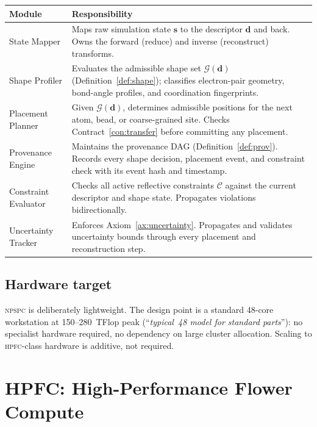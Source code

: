 \documentclass[11pt,a4paper]{article}
\theoremstyle{definition}
\theoremstyle{plain}
\newcommand{\NPSPC}{\textsc{npspc}}
\newcommand{\HPFC}{\textsc{hpfc}}
\newcommand{\desc}{\boldsymbol{d}}
\newcommand{\state}{\boldsymbol{s}}
\newcommand{\constraint}{\mathcal{C}}
\begin{document}
\begin{center}
\begin{tabular}{@{}lp{8.5cm}@{}}
\toprule
\textbf{Module} & \textbf{Responsibility} \\
\midrule
State Mapper &
  Maps raw simulation state $\state$ to the descriptor $\desc$ and back.
  Owns the forward (reduce) and inverse (reconstruct) transforms. \\[4pt]

Shape Profiler &
  Evaluates the admissible shape set $\mathcal{G}(\desc)$
  (Definition~\ref{def:shape}); classifies electron-pair geometry,
  bond-angle profiles, and coordination fingerprints. \\[4pt]

Placement Planner &
  Given $\mathcal{G}(\desc)$, determines admissible positions for
  the next atom, bead, or coarse-grained site.  Checks
  Contract~\ref{con:transfer} before committing any placement. \\[4pt]

Provenance Engine &
  Maintains the provenance DAG (Definition~\ref{def:prov}).
  Records every shape decision, placement event, and constraint
  check with its event hash and timestamp. \\[4pt]

Constraint Evaluator &
  Checks all active reflective constraints $\constraint$ against
  the current descriptor and shape state.  Propagates violations
  bidirectionally. \\[4pt]

Uncertainty Tracker &
  Enforces Axiom~\ref{ax:uncertainty}.  Propagates and validates
  uncertainty bounds through every placement and reconstruction
  step. \\
\bottomrule
\end{tabular}
\end{center}

\subsection{Hardware target}

\NPSPC{} is deliberately lightweight.  The design point is a
standard 48-core workstation at 150--280~TFlop peak
(``\emph{typical~48 model for standard parts}''): no specialist
hardware required, no dependency on large cluster allocation.
Scaling to \HPFC{}-class hardware is additive, not required.

\section{HPFC: High-Performance Flower Compute}
\label{sec:hpfc}
\end{document}
